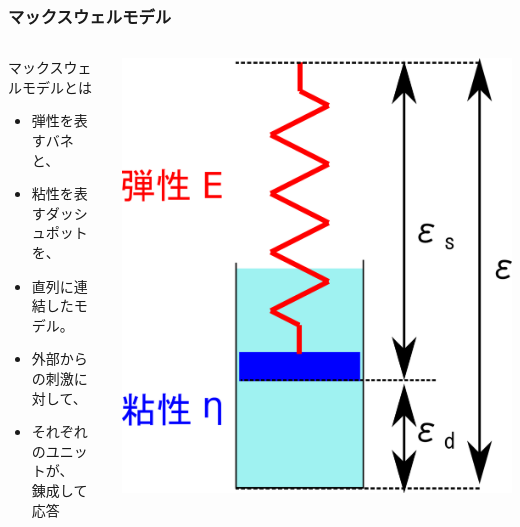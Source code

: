 \documentclass[unicode,12pt]{beamer}%
\begin{document}
\begin{frame}
	\frametitle{マックスウェルモデル}
		\begin{columns}[T, onlytextwidth]
				\begin{block}{マックスウェルモデルとは}
					\begin{itemize}
						\item 弾性を表すバネと、
						\item 粘性を表すダッシュポットを、
						\item 直列に連結したモデル。
						\item 外部からの刺激に対して、
						\item それぞれのユニットが、\\錬成して応答
					\end{itemize}
				\end{block}
				\includegraphics[width=\textwidth]{Maxwell_model.png}
		\end{columns}
\end{frame}
\end{document}
